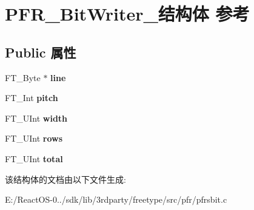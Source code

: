 \hypertarget{struct_p_f_r___bit_writer__}{}\section{P\+F\+R\+\_\+\+Bit\+Writer\+\_\+结构体 参考}
\label{struct_p_f_r___bit_writer__}
\subsection*{Public 属性}
\begin{DoxyCompactItemize}
\item 
\mbox{\label{struct_p_f_r___bit_writer___aad865baec1501005109dcf6d9fcaf3f2}} 
F\+T\+\_\+\+Byte $\ast$ {\bfseries line}
\item 
\mbox{\label{struct_p_f_r___bit_writer___ae1f2d3c2154719970bd4e21787306ffa}} 
F\+T\+\_\+\+Int {\bfseries pitch}
\item 
\mbox{\label{struct_p_f_r___bit_writer___af3ad7d3fc610495123a4b8a4923d279b}} 
F\+T\+\_\+\+U\+Int {\bfseries width}
\item 
\mbox{\label{struct_p_f_r___bit_writer___ae5cabbdde057f7eb3249c1808af71647}} 
F\+T\+\_\+\+U\+Int {\bfseries rows}
\item 
\mbox{\label{struct_p_f_r___bit_writer___a0766dd3c6891bb1624339713cb71d2f9}} 
F\+T\+\_\+\+U\+Int {\bfseries total}
\end{DoxyCompactItemize}


该结构体的文档由以下文件生成\+:\begin{DoxyCompactItemize}
\item 
E\+:/\+React\+O\+S-\/0../sdk/lib/3rdparty/freetype/src/pfr/pfrsbit.\+c\end{DoxyCompactItemize}
